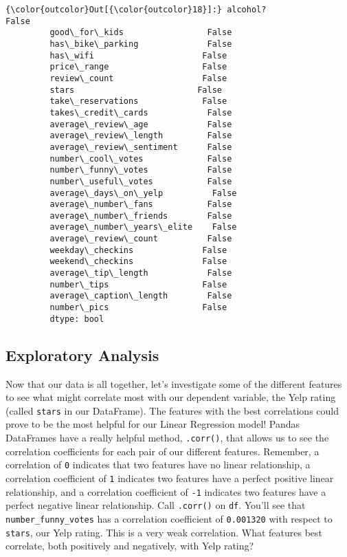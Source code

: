 \documentclass[11pt]{article}
\begin{document}
\begin{Verbatim}[commandchars=\\\{\}]
{\color{outcolor}Out[{\color{outcolor}18}]:} alcohol?                      False
         good\_for\_kids                 False
         has\_bike\_parking              False
         has\_wifi                      False
         price\_range                   False
         review\_count                  False
         stars                         False
         take\_reservations             False
         takes\_credit\_cards            False
         average\_review\_age            False
         average\_review\_length         False
         average\_review\_sentiment      False
         number\_cool\_votes             False
         number\_funny\_votes            False
         number\_useful\_votes           False
         average\_days\_on\_yelp          False
         average\_number\_fans           False
         average\_number\_friends        False
         average\_number\_years\_elite    False
         average\_review\_count          False
         weekday\_checkins              False
         weekend\_checkins              False
         average\_tip\_length            False
         number\_tips                   False
         average\_caption\_length        False
         number\_pics                   False
         dtype: bool
\end{Verbatim}
            
    \hypertarget{exploratory-analysis}{%
\subsection{Exploratory Analysis}\label{exploratory-analysis}}

Now that our data is all together, let's investigate some of the
different features to see what might correlate most with our dependent
variable, the Yelp rating (called \texttt{stars} in our DataFrame). The
features with the best correlations could prove to be the most helpful
for our Linear Regression model! Pandas DataFrames have a really helpful
method, \texttt{.corr()}, that allows us to see the correlation
coefficients for each pair of our different features. Remember, a
correlation of \texttt{0} indicates that two features have no linear
relationship, a correlation coefficient of \texttt{1} indicates two
features have a perfect positive linear relationship, and a correlation
coefficient of \texttt{-1} indicates two features have a perfect
negative linear relationship. Call \texttt{.corr()} on \texttt{df}.
You'll see that \texttt{number\_funny\_votes} has a correlation
coefficient of \texttt{0.001320} with respect to \texttt{stars}, our
Yelp rating. This is a very weak correlation. What features best
correlate, both positively and negatively, with Yelp rating?
\end{document}
